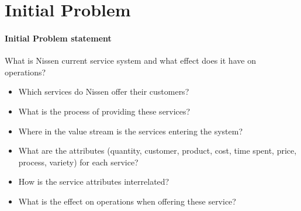 \chapter{Initial Problem}\label{ch:problematisation}



\subsubsection{Initial Problem statement}

What is Nissen current service system and what effect does it have on operations?

\begin{itemize}
    \item Which services do Nissen offer their customers?
    \item What is the process of providing these services?
    \item Where in the value stream is the services entering the system?
    \item What are the attributes (quantity, customer, product, cost, time spent, price, process, variety) for each service?
    \item How is the service attributes interrelated?
    \item What is the effect on operations when offering these service? 
\end{itemize}

